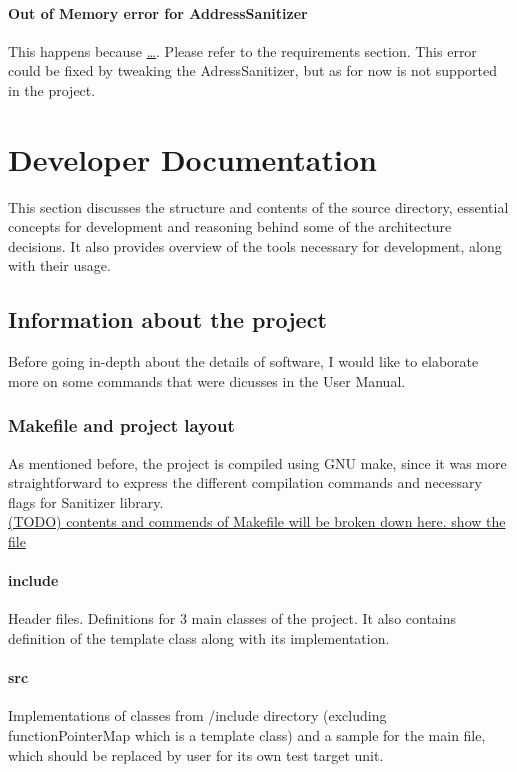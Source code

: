 \documentclass{elteikthesis}[2018/06/06]
\begin{document}
\subsubsection{Out of Memory error for AddressSanitizer}
\label{sec-2-5-2-1}
This happens because \uline{\ldots{}}. Please refer to the requirements section. This error could be fixed by tweaking the AdressSanitizer, but as for now is not supported in the project. \\
\chapter{Developer Documentation}
\label{sec-3}
This section discusses the structure and contents of the source directory, essential concepts for development and reasoning behind some of the architecture decisions. It also provides overview of the tools necessary for development, along with their usage. \\
\section{Information about the project}
\label{sec-3-1}
Before going in-depth about the details of software, I would like to elaborate more on some commands that were dicusses in the User Manual. \\
\subsection{Makefile and project layout}
\label{sec-3-1-1}
As mentioned before, the project is compiled using GNU make, since it was more straightforward to express the different compilation commands and necessary flags for Sanitizer library. \\

\uline{(TODO) contents and commends of Makefile will be broken down here. show the file} \\
\subsubsection{include}
\label{sec-3-1-1-1}
Header files. Definitions for 3 main classes of the project. It also contains definition of the template class along with its implementation. \\
\subsubsection{src}
\label{sec-3-1-1-2}
Implementations of classes from /include directory (excluding functionPointerMap which is a template class) and a sample for the main file, which should be replaced by user for its own test target unit. \\
\end{document}
